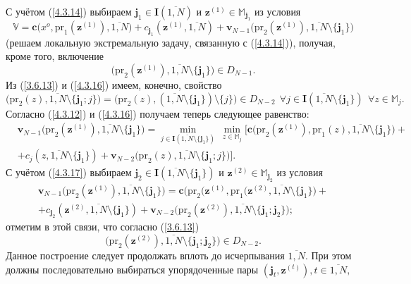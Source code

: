 \documentclass[12pt]{report}
\newcommand{\bfn}{\begin{equation}}
\newcommand{\efn}{\end{equation}}
\newcommand{\ov}{\overline}
\newcommand{\sm}{\setminus}
\newcommand{\fa}{\forall}
\newcommand{\bbm}{{\mathbb M}}
\begin{document}
{С учётом (\ref{4.3.14}) выбираем $\mathbf{j}_1\in \mathbf{I}(\ov{1,N})$ и
$\mathbf{z}^{(1)}\in \bbm_{\mathbf{j}_1}$ из условия
\bfn\label{4.3.15}
\mathbb{V}= \mathbf{c}\bigl(x^o,\mathrm{pr}_1(\mathbf{z}^{(1)}),\ov{1,N}\bigl) +
c_{\mathbf{j}_1}(\mathbf{z}^{(1)},\ov{1,N}) + \mathbf{v}_{N-1}
\bigl(\mathrm{pr}_2(\mathbf{z}^{(1)}),\ov{1,N}\sm\{\mathbf{j}_1\}\bigl)
\efn
(решаем локальную экстремальную задачу, связанную с (\ref{4.3.14})),
получая, кроме того, включение
\bfn\label{4.3.16}
\bigl(\mathrm{pr}_2(\mathbf{z}^{(1)}),\ov{1,N}\sm\{\mathbf{j}_1\}\bigl)\in D_{N-1}.
\efn
Из (\ref{3.6.13}) и (\ref{4.3.16}) имеем, конечно, свойство
$$
\bigl(\mathrm{pr}_2(z),\ov{1,N}\sm\{\mathbf{j}_1;j\}\bigl) =
\bigl(\mathrm{pr}_2(z),(\ov{1,N}\sm
\{\mathbf{j}_1\})\sm\{j\}\bigl)\in D_{N-2}\ \ \fa j\in
\mathbf{I}(\ov{1,N}\sm\{\mathbf{j}_1\})\
\ \fa z\in \bbm_j.
$$
Согласно (\ref{4.3.12}) и (\ref{4.3.16}) получаем теперь следующее равенство:
\begin{eqnarray}
&\mathbf{v}_{N-1}\bigl(\mathrm{pr}_2(\mathbf{z}^{(1)}),\ov{1,N}\sm\{\mathbf{j}_1\}
\bigl)=\min\limits_{j\in\mathbf{I}(\ov{1,N}\sm\{\mathbf{j}_1\})}\
\min\limits_{z\in\bbm_j}\bigl[\mathbf{c}\bigl(\mathrm{pr}_2(\mathbf{z}^{(1)}),\mathrm{pr}_1(z),
\ov{1,N}\sm \{\mathbf{j}_1\}\bigl) +
&\nonumber\\
&+ c_j(z,\ov{1,N}\sm\{\mathbf{j}_1\}) +
\mathbf{v}_{N-2}\bigl(\mathrm{pr}_2(z),\ov{1,N}\sm\{\mathbf{j}_1;j\}\bigl)\bigl].
&\label{4.3.17}
\end{eqnarray}
С учётом (\ref{4.3.17}) выбираем $\mathbf{j}_2\in \mathbf{I}(\ov{1,N}\sm
\{\mathbf{j}_1\})$ и $\mathbf{z}^{(2)}\in \bbm_{\mathbf{j}_2}$ из условия
\begin{eqnarray}
&\mathbf{v}_{N-1}\bigl(\mathrm{pr}_2(\mathbf{z}^{(1)}),\ov{1,N}\sm\{\mathbf{j}_1\}
\bigl) = \mathbf{c}\bigl(\mathrm{pr}_2(\mathbf{z}^{(1)}, \mathrm{pr}_1(\mathbf{z}^{(2)},\ov{1,N}\sm
\{\mathbf{j}_1\}\bigl) +
&\nonumber\\
&+ c_{\mathbf{j}_2}(\mathbf{z}^{(2)}, \ov{1,N}\sm\{\mathbf{j}_1\}) +
\mathbf{v}_{N-2}\bigl(\mathrm{pr}_2(\mathbf{z}^{(2)}),\ov{1,N}\sm\{\mathbf{j}_1;\mathbf{j}_2\}\bigl);
&\label{4.3.18}
\end{eqnarray}
отметим в этой связи, что согласно (\ref{3.6.13})
$$\bigl(\mathrm{pr}_2(\mathbf{z}^{(2)}),\ov{1,N}\sm\{\mathbf{j}_1;\mathbf{j}_2\}\bigl)\in D_{N-2}.
$$
Данное построение следует продолжать вплоть до исчерпывания $\ov{1,N}.$ При этом должны
последовательно выбираться упорядоченные пары $(\mathbf{j}_t,\mathbf{z}^{(t)}), t\in \ov{1,N},$
}
\end{document}
